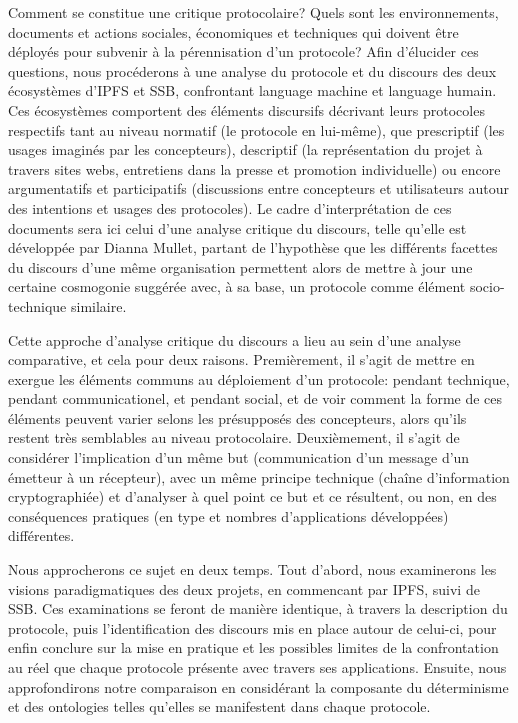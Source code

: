 \documentclass{article}
\begin{document}
Comment se constitue une critique protocolaire? Quels sont les environnements, documents et actions sociales, économiques et techniques qui doivent être déployés pour subvenir à la pérennisation d'un protocole? Afin d'élucider ces questions, nous procéderons à une analyse du protocole et du discours des deux écosystèmes d'IPFS et SSB, confrontant language machine et language humain. Ces écosystèmes comportent des éléments discursifs décrivant leurs protocoles respectifs tant au niveau normatif (le protocole en lui-même), que prescriptif (les usages imaginés par les concepteurs), descriptif (la représentation du projet à travers sites webs, entretiens dans la presse et promotion individuelle) ou encore argumentatifs et participatifs (discussions entre concepteurs et utilisateurs autour des intentions et usages des protocoles). Le cadre d'interprétation de ces documents sera ici celui d'une analyse critique du discours, telle qu'elle est développée par Dianna Mullet\cite{mullet_general_2018}, partant de l'hypothèse que les différents facettes du discours d'une même organisation permettent alors de mettre à jour une certaine cosmogonie suggérée avec, à sa base, un protocole comme élément socio-technique similaire.

Cette approche d'analyse critique du discours a lieu au sein d'une analyse comparative, et cela pour deux raisons. Premièrement, il s'agit de mettre en exergue les éléments communs au déploiement d'un protocole: pendant technique, pendant communicationel, et pendant social, et de voir comment la forme de ces éléments peuvent varier selons les présupposés des concepteurs, alors qu'ils restent très semblables au niveau protocolaire. Deuxièmement, il s'agit de considérer l'implication d'un même but (communication d'un message d'un émetteur à un récepteur), avec un même principe technique (chaîne d'information cryptographiée) et d'analyser à quel point ce but et ce  résultent, ou non, en des conséquences pratiques (en type et nombres d'applications développées) différentes.

Nous approcherons ce sujet en deux temps. Tout d'abord, nous examinerons les visions paradigmatiques des deux projets, en commencant par IPFS, suivi de SSB. Ces examinations se feront de manière identique, à travers la description du protocole, puis l'identification des discours mis en place autour de celui-ci, pour enfin conclure sur la mise en pratique et les possibles limites de la confrontation au réel que chaque protocole présente avec travers ses applications. Ensuite, nous approfondirons notre comparaison en considérant la composante du déterminisme et des ontologies telles qu'elles se manifestent dans chaque protocole.
\end{document}
